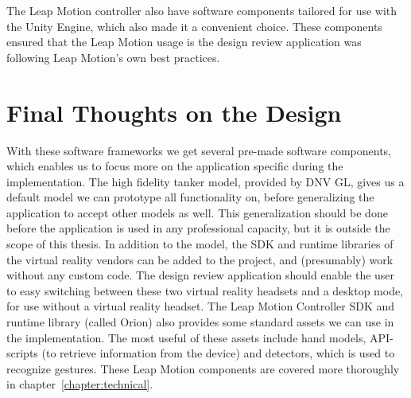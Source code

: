 The Leap Motion controller also have software components tailored for use with the Unity Engine, which also made it a convenient choice. 
These components ensured that the Leap Motion usage is the design review application was following Leap Motion's own best practices. 

\section{Final Thoughts on the Design}
With these software frameworks we get several pre-made software components, which enables us to focus more on the application specific during the implementation.
The high fidelity tanker model, provided by DNV GL, gives us a default model we can prototype all functionality on, before generalizing the application to accept other models as
well. This generalization should be done before the application is used in any professional capacity, but it is outside the scope of this thesis. 
In addition to the model, the SDK and runtime libraries of the virtual reality vendors can be added to the project, and (presumably) work without any custom code. 
The design review application should enable the user to easy switching between these two virtual reality headsets and a desktop mode, for use without a virtual reality headset.
The Leap Motion Controller SDK and runtime library (called Orion) also provides some standard assets we can use in the implementation. 
The most useful of these assets include hand models, API-scripts (to retrieve information from the device) and detectors, which is used to recognize gestures. 
These Leap Motion components are covered more thoroughly in chapter~\ref{chapter:technical}.







